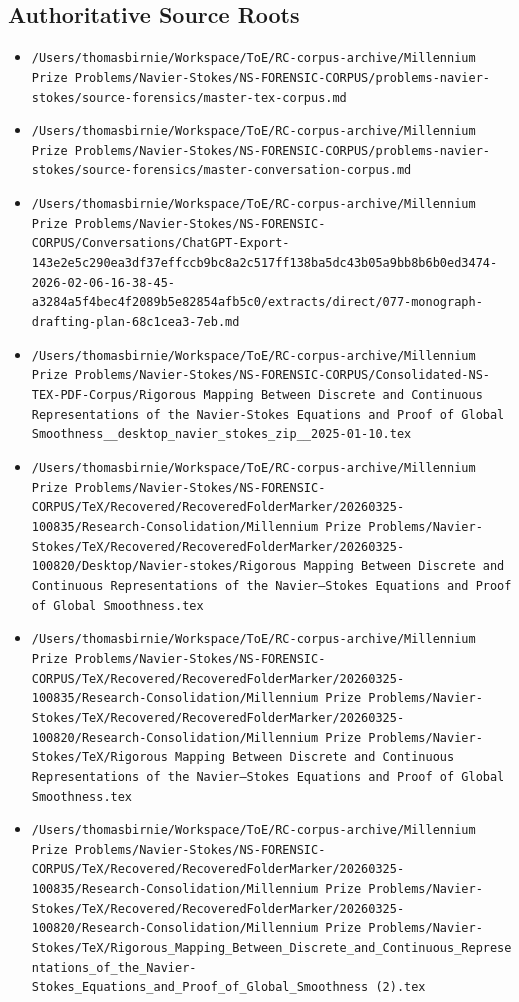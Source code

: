 \subsection{Authoritative Source Roots}
\begin{itemize}
\item \texttt{/Users/thomasbirnie/Workspace/ToE/RC-corpus-archive/Millennium Prize Problems/Navier-Stokes/NS-FORENSIC-CORPUS/problems-navier-stokes/source-forensics/master-tex-corpus.md}
\item \texttt{/Users/thomasbirnie/Workspace/ToE/RC-corpus-archive/Millennium Prize Problems/Navier-Stokes/NS-FORENSIC-CORPUS/problems-navier-stokes/source-forensics/master-conversation-corpus.md}
\item \texttt{/Users/thomasbirnie/Workspace/ToE/RC-corpus-archive/Millennium Prize Problems/Navier-Stokes/NS-FORENSIC-CORPUS/Conversations/ChatGPT-Export-143e2e5c290ea3df37effccb9bc8a2c517ff138ba5dc43b05a9bb8b6b0ed3474-2026-02-06-16-38-45-a3284a5f4bec4f2089b5e82854afb5c0/extracts/direct/077-monograph-drafting-plan-68c1cea3-7eb.md}
\item \texttt{/Users/thomasbirnie/Workspace/ToE/RC-corpus-archive/Millennium Prize Problems/Navier-Stokes/NS-FORENSIC-CORPUS/Consolidated-NS-TEX-PDF-Corpus/Rigorous Mapping Between Discrete and Continuous Representations of the Navier-Stokes Equations and Proof of Global Smoothness\_\_desktop\_navier\_stokes\_zip\_\_2025-01-10.tex}
\item \texttt{/Users/thomasbirnie/Workspace/ToE/RC-corpus-archive/Millennium Prize Problems/Navier-Stokes/NS-FORENSIC-CORPUS/TeX/Recovered/RecoveredFolderMarker/20260325-100835/Research-Consolidation/Millennium Prize Problems/Navier-Stokes/TeX/Recovered/RecoveredFolderMarker/20260325-100820/Desktop/Navier-stokes/Rigorous Mapping Between Discrete and Continuous Representations of the Navier–Stokes Equations and Proof of Global Smoothness.tex}
\item \texttt{/Users/thomasbirnie/Workspace/ToE/RC-corpus-archive/Millennium Prize Problems/Navier-Stokes/NS-FORENSIC-CORPUS/TeX/Recovered/RecoveredFolderMarker/20260325-100835/Research-Consolidation/Millennium Prize Problems/Navier-Stokes/TeX/Recovered/RecoveredFolderMarker/20260325-100820/Research-Consolidation/Millennium Prize Problems/Navier-Stokes/TeX/Rigorous Mapping Between Discrete and Continuous Representations of the Navier–Stokes Equations and Proof of Global Smoothness.tex}
\item \texttt{/Users/thomasbirnie/Workspace/ToE/RC-corpus-archive/Millennium Prize Problems/Navier-Stokes/NS-FORENSIC-CORPUS/TeX/Recovered/RecoveredFolderMarker/20260325-100835/Research-Consolidation/Millennium Prize Problems/Navier-Stokes/TeX/Recovered/RecoveredFolderMarker/20260325-100820/Research-Consolidation/Millennium Prize Problems/Navier-Stokes/TeX/Rigorous\_Mapping\_Between\_Discrete\_and\_Continuous\_Representations\_of\_the\_Navier-Stokes\_Equations\_and\_Proof\_of\_Global\_Smoothness (2).tex}

\end{itemize}
